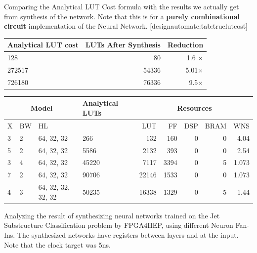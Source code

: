\newpage


\begin{table}
    \begin{sidecaption}{%
        Comparing the Analytical LUT Cost formula with the results we actually get from synthesis of the network. Note that this is for a \textbf{purely combinational circuit} implementation of the Neural Network. 
    }[designautomate:tab:truelutcost]
\begin{threeparttable}
\begin{tabular}{lrr}
\hline
Analytical LUT cost & LUTs After Synthesis & Reduction     \\ \hline
128      & 80                & 1.6 $\times$  \\
272517   & 54336             & 5.01$\times$  \\
726180   & 76336             &  9.5$\times$  \\ \hline
\end{tabular}
\end{threeparttable}
\end{sidecaption}
\end{table}


\begin{table}
\begin{threeparttable}
\begin{tabular}{llllrrrrr}
\hline
\multicolumn{3}{c}{Model}      & Analytical LUTs & \multicolumn{5}{c}{Resources}    \\ \hline
X  & BW & HL                   &                 & LUT   & FF   & DSP & BRAM & WNS  \\ \hline
3  & 2  & 64, 32, 32           & 266             & 132   & 160  & 0   & 0    & 4.04 \\
5  & 2  & 64, 32, 32           & 5586            & 2132  & 393  & 0   & 0    & 2.54 \\
3  & 4  & 64, 32, 32           & 45220           & 7117  & 3394 & 0   & 5    & 1.073\\
7  & 2  & 64, 32, 32           & 90706           & 22146 & 1533 & 0   & 0    & 1.073\\
4  & 3  & 64, 32, 32, 32, 32   & 50235           & 16338 & 1329 & 0   & 5    & 1.44 \\ \hline
\end{tabular}
\end{threeparttable}
\begin{caption}{%
    Analyzing the result of synthesizing neural networks trained on the Jet Substructure Classification problem by FPGA4HEP, using different Neuron Fan-Ins. The synthesized networks have registers between layers and at the input. Note that the clock target was 5ns. 
}
\label{designautomate:tab:fpga4hepwithregs}
\end{caption}
\end{table}

